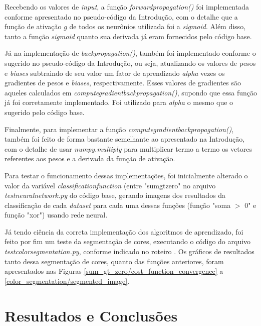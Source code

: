 \documentclass[conference]{IEEEtran}
\begin{document}
Recebendo os valores de \textit{input}, a função \textit{forward\underline{\space}propagation()} foi implementada conforme apresentado no pseudo-código da Introdução, com o detalhe que a função de ativação $g$ de todos os neurônios utilizada foi a \textit{sigmoid}. Além disso, tanto a função \textit{sigmoid} quanto sua derivada já eram fornecidos pelo código base. 

Já na implementação de \textit{back\underline{\space}propagation()}, também foi implementado conforme o sugerido no pseudo-código da Introdução, ou seja, atualizando os valores de pesos e \textit{biases} subtraindo de seu valor um fator de aprendizado \textit{alpha} vezes os gradientes de pesos e \textit{biases}, respectivamente. Esses valores de gradientes são aqueles calculados em \textit{compute\underline{\space}gradient\underline{\space}back\underline{\space}propagation()}, supondo que essa função já foi corretamente implementado. Foi utilizado para \textit{alpha} o mesmo que o sugerido pelo código base. 

Finalmente, para implementar a função \textit{compute\underline{\space}gradient\underline{\space}back\underline{\space}propagation()}, também foi feito de forma bastante semelhante ao apresentado na Introdução, com o detalhe de usar \textit{numpy.multiply} para multiplicar termo a termo os vetores referentes aos pesos e a derivada da função de ativação.

Para testar o funcionamento dessas implementações, foi inicialmente alterado o valor da variável \textit{classification\underline{\space}function} (entre "sum\underline{\space}gt\underline{\space}zero" no arquivo \textit{test\underline{\space}neural\underline{\space}network.py} do código base, gerando imagens dos resultados da classificação de cada \textit{dataset} para cada uma dessas funções (função "soma $>$ 0" e função "xor") usando rede neural.

Já tendo ciência da correta implementação dos algoritmos de aprendizado, foi feito por fim um teste da segmentação de cores, executando o código do arquivo \textit{test\underline{\space}color\underline{\space}segmentation.py}, conforme indicado no roteiro \cite{roteiro}. Os gráficos de resultados tanto dessa segmentação de cores, quanto das funções anteriores, foram apresentados nas Figuras \ref{sum_gt_zero/cost_function_convergence} a \ref{color_segmentation/segmented_image}.

\section{Resultados e Conclusões}
\end{document}
